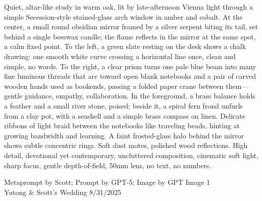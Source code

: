 \documentclass[12pt]{article}
\begin{document}
\noindent
\begin{adjustbox}{max size={\textwidth}{\textheight}}
\begin{varwidth}{\textwidth}
\RaggedRight
\footnotesize
Quiet, altar-like study in warm oak, lit by late-afternoon Vienna light through a simple Secession-style stained-glass arch window in amber and cobalt. At the center, a small round obsidian mirror framed by a silver serpent biting its tail, set behind a single beeswax candle; the flame reflects in the mirror at the same spot, a calm fixed point. To the left, a green slate resting on the desk shows a chalk drawing: one smooth white curve crossing a horizontal line once, clean and simple, no words. To the right, a clear prism turns one pale blue beam into many fine luminous threads that arc toward open blank notebooks and a pair of carved wooden hands used as bookends, passing a folded paper crane between them—gentle guidance, empathy, collaboration. In the foreground, a brass balance holds a feather and a small river stone, poised; beside it, a spiral fern frond unfurls from a clay pot, with a seashell and a simple brass compass on linen. Delicate ribbons of light braid between the notebooks like traveling beads, hinting at growing bandwidth and learning. A faint frosted-glass halo behind the mirror shows subtle concentric rings. Soft dust motes, polished wood reflections. High detail, devotional yet contemporary, uncluttered composition, cinematic soft light, sharp focus, gentle depth-of-field, 50mm lens, no text, no numbers.
\end{varwidth}
\end{adjustbox}
\vfill
{\raggedleft\footnotesize
Metaprompt by Scott; Prompt by GPT-5; Image by GPT Image 1 \\
Yutong \& Scott's Wedding 8/31/2025\par}
\end{document}
